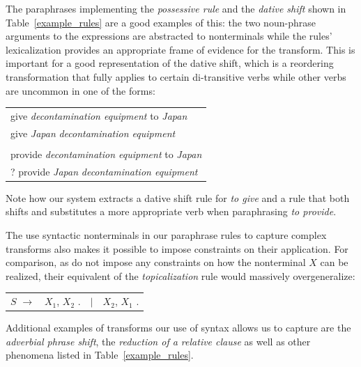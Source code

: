 \documentclass[11pt]{article}
\begin{document}
The paraphrases implementing the \emph{possessive rule} and the
\emph{dative shift} shown in Table~\ref{example_rules} are a good
examples of this: the two noun-phrase arguments to the expressions are
abstracted to nonterminals while the rules' lexicalization provides an
appropriate frame of evidence for the transform. This is important for
a good representation of the dative shift, which is a reordering
transformation that fully applies to certain di-transitive verbs while
other verbs are uncommon in one of the forms:
\begin{center}
\begin{tabular}{l}
  give \emph{decontamination equipment} to \emph{Japan} \\
  give \emph{Japan} \emph{decontamination equipment} \\
  \vspace{-10pt}\\
  provide \emph{decontamination equipment} to \emph{Japan} \\
  ? provide \emph{Japan} \emph{decontamination equipment} \\
\end{tabular}
\end{center}
Note how our system extracts a dative shift rule for \emph{to give}
and a rule that both shifts and substitutes a more appropriate verb
when paraphrasing \emph{to provide}.

The use syntactic nonterminals in our paraphrase rules to capture
complex transforms also makes it possible to impose constraints on
their application. For comparison, as  do not
impose any constraints on how the nonterminal $X$ can be realized,
their equivalent of the \emph{topicalization} rule would massively
overgeneralize:
\begin{center}
\begin{tabular}{rrcl}
  $\mathit{S}$ $\rightarrow$ & $\mathit{X}_1$,
  $\mathit{X}_2$ . & $\mid$ & $\mathit{X}_2$, $\mathit{X}_1$ . \\
\end{tabular}
\end{center}
Additional examples of transforms our use of syntax allows us to
capture are the \emph{adverbial phrase shift}, the \emph{reduction of
  a relative clause} as well as other phenomena listed in
Table~\ref{example_rules}.
 
\end{document}
